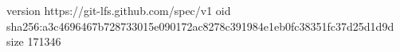 version https://git-lfs.github.com/spec/v1
oid sha256:a3c4696467b728733015e090172ac8278c391984e1eb0fc38351fc37d25d1d9d
size 171346
